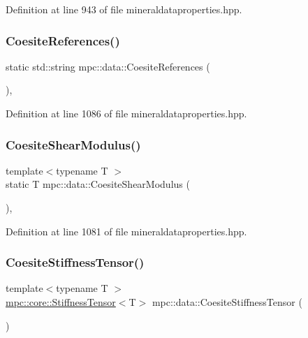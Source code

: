 Definition at line 943 of file mineraldataproperties.\+hpp.

\mbox{\label{namespacempc_1_1data_a6e58e789c31ee9a13422ff5ef69f114e}} 
\subsubsection{\texorpdfstring{Coesite\+References()}{CoesiteReferences()}}
{\footnotesize\ttfamily static std\+::string mpc\+::data\+::\+Coesite\+References (\begin{DoxyParamCaption}{ }\end{DoxyParamCaption})\hspace{0.3cm}{\ttfamily [inline]}, {\ttfamily [static]}}



Definition at line 1086 of file mineraldataproperties.\+hpp.

\mbox{\label{namespacempc_1_1data_acc284538072652ad8f18566db7d7d68c}} 
\subsubsection{\texorpdfstring{Coesite\+Shear\+Modulus()}{CoesiteShearModulus()}}
{\footnotesize\ttfamily template$<$typename T $>$ \\
static T mpc\+::data\+::\+Coesite\+Shear\+Modulus (\begin{DoxyParamCaption}{ }\end{DoxyParamCaption})\hspace{0.3cm}{\ttfamily [inline]}, {\ttfamily [static]}}



Definition at line 1081 of file mineraldataproperties.\+hpp.

\mbox{\label{namespacempc_1_1data_a5cbb5cf93c39b009c94e660ccec1cd9a}} 
\subsubsection{\texorpdfstring{Coesite\+Stiffness\+Tensor()}{CoesiteStiffnessTensor()}}
{\footnotesize\ttfamily template$<$typename T $>$ \\
\mbox{\hyperlink{structmpc_1_1core_1_1_stiffness_tensor}{mpc\+::core\+::\+Stiffness\+Tensor}}$<$T$>$ mpc\+::data\+::\+Coesite\+Stiffness\+Tensor (\begin{DoxyParamCaption}{ }\end{DoxyParamCaption})}



